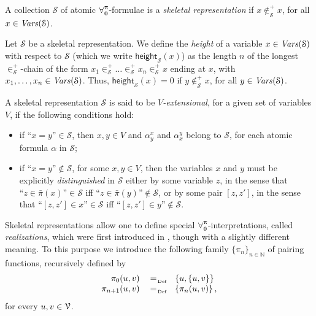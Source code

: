 \documentclass[a4paper,UKenglish]{lipics}
\newcommand{\Lang}{\ensuremath{\mathbf{\forall_{0}^{\pi}}}\xspace}
\newcommand{\nonpairs}[1]{\bar{\pi}(#1)}
\newcommand{\atset}{\mathcal{S}}
\newcommand{\vheight}{\mathsf{height}_{\atset}}
\newcommand{\memclosure}[1]{\in_{#1}^{+}}
\newcommand{\aslit}[1]{\mbox{``}#1\mbox{''}}
\begin{document}
A collection $\atset$ of atomic \Lang-formulae is a
\emph{skeletal representation} if $x \not \memclosure{\atset} x$, for all
$x \in \Vars(\atset)$.

Let $\atset$ be a skeletal representation.  We define the
\emph{height} of a variable $x \in \Vars(\atset)$ with respect to
$\atset$ (which we write $\vheight(x)$) as the length $n$ of the
longest $\memclosure{\atset}$-chain of the form $x_1
\memclosure{\atset} \ldots \memclosure{\atset} x_n \memclosure{\atset}
x$ ending at $x$, with $x_1, \ldots ,x_n \in \Vars(\atset)$.  Thus,
$\vheight(x)=0$ if $y \not\memclosure{\atset} x$, for all $y \in
\Vars(\atset)$.

A skeletal representation $\atset$ is said to be
$V$\emph{-extensional}, for a given set of variables $V$, if the following conditions hold:
\begin{itemize}
 \item if $\aslit{x=y} \in \atset$, then $x,y \in V$ and
 $\alpha_y^x$ and $\alpha_x^y$ belong to $\atset$, for each atomic
 formula $\alpha$ in $\atset$;

 \item if $\aslit{x=y} \notin \atset$, for some $x,y \in V$, then the
 variables $x$ and $y$ must be explicitly \emph{distinguished} in
 $\atset$ either by some variable $z$, in the sense that $\aslit{z \in
 \nonpairs{x}} \in \atset$ iff $\aslit{z \in \nonpairs{y}} \notin
 \atset$, or by some pair $[z,z']$, in the sense that $\aslit{[z,z']
 \in x} \in \atset$ iff $\aslit{[z,z'] \in y} \notin \atset$.
\end{itemize}


Skeletal representations allow one to define special
\Lang-interpretations, called \emph{realizations}, which were first
introduced in \cite{CanFer1995}, though with a slightly different
meaning.  To this purpose we introduce the following family
$\{\pi_n\}_{n \in \mathbb{N}}$ of pairing functions, recursively
defined by
$$
\begin{array}{rcl}
  \pi_0(u,v) & \defAs & \{u, \{u,v\}\}\\
  \pi_{n+1}(u,v) & \defAs & \{ \pi_n(u,v)\}\, ,
\end{array}
$$
for every $u,v \in \mathcal{V}$.
\end{document}
